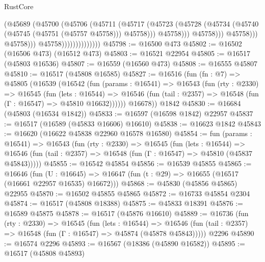 \begin{lexlean}{RustCore}
\begin{coremodule}
                                            (@45689
                                              (@45700
                                                (@45706
                                                  (@45711
                                                    (@45717
                                                      (@45723
                                                        (@45728
                                                          (@45734
                                                            (@45740
                                                              (@45745 (@45751 (@45757 @45758)))
                                                              @45758)))
                                                        @45758)))
                                                  @45758)))
                                            @45758)))
                                      @45758)))
                                @45758))))))))))))))
@45798 := @16500 @473
@45802 := @16502 (@16506 @473) (@16512 @473)
@45803 := @16521 @22954
@45805 := @16517 (@45803 @16536)
@45807 := @16559 (@16560 @473)
@45808 := @16555 @45807
@45810 := @16517 (@45808 @16585)
@45827 := @16516
    (fun (fn : @7) =>
    @45805
      (@16539
        (@16542
          (fun (params : @16541) =>
          @16543
            (fun (rty : @2330) =>
            @16545
              (fun (lets : @16544) =>
              @16546 (fun (tail : @2357) => @16548 (fun (Γ : @16547) => @45810 @16632))))))
        @16678))
    @1842
@45830 := @16684 (@45803 (@16534 @1842))
@45833 := @16597 (@16598 @1842) @22957
@45837 := @16517 (@16589 (@45833 @16606) @16610)
@45838 := @16623 @1842
@45843 := @16620 (@16622 @45838 @22960 @16578 @16580)
@45854 := fun (params : @16541) =>
  @16543
    (fun (rty : @2330) =>
    @16545
      (fun (lets : @16544) =>
      @16546 (fun (tail : @2357) => @16548 (fun (Γ : @16547) => @45810 (@45837 @45843)))))
@45855 := @16542 @45854
@45856 := @16539 @45855
@45865 := @16646
    (fun (U : @16645) => @16647 (fun (t : @29) => @16655 (@16517 (@16661 @22957 @16535) @16672)))
@45868 := @45830 (@45856 @45865) @22955
@45870 := @16502 @45855 @45865
@45872 := @16733 @45854 @2304
@45874 := @16517 (@45808 @18388)
@45875 := @45833 @18391
@45876 := @16589 @45875
@45878 := @16517 (@45876 @16610)
@45889 := @16736
    (fun (rty : @2330) =>
    @16545
      (fun (lets : @16544) =>
      @16546 (fun (tail : @2357) => @16548 (fun (Γ : @16547) => @45874 (@45878 @45843)))))
    @2296
@45890 := @16574 @2296
@45893 := @16567 (@18386 (@45890 @16582))
@45895 := @16517 (@45808 @45893)

\end{coremodule}
\end{lexlean}
